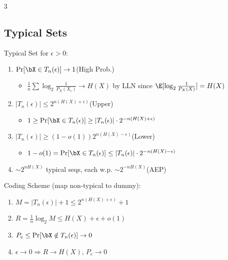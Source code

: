 \documentclass[12pt, a4paper]{article}
\begin{document}
\begin{multicols*}{3}
\subsection{Typical Sets}
Typical Set for $\epsilon>0$:
\begin{enumerate}[\roman*.]
  \item $\Pr[\bX\in T_n(\epsilon)]\to 1$\hfill(High Prob.)
    \begin{itemize}[leftmargin=*]\vspace{3pt}
      \item $\tfrac{1}{n}\sum\log_2\tfrac{1}{P_X(X_i)}\to H(X)$ by LLN since $\E[\log_2\tfrac{1}{P_X(X)}]=H(X)$
    \end{itemize}
  \item $|T_n(\epsilon)|\le 2^{n(H(X)+\epsilon)}$\hfill(Upper)
    \begin{itemize}[leftmargin=*]\vspace{3pt}
      \item $1\ge\Pr[\bX\in T_n(\epsilon)]\ge|T_n(\epsilon)|\cdot 2^{-n(H(X)+\epsilon)}$
    \end{itemize}
  \item $|T_n(\epsilon)|\ge(1-o(1))2^{n(H(X)-\epsilon)}$\hfill(Lower)
    \begin{itemize}[leftmargin=*]\vspace{3pt}
      \item $1-o(1)=\Pr[\bX\in T_n(\epsilon)]\le|T_n(\epsilon)|\cdot 2^{-n(H(X)-\epsilon)}$
    \end{itemize}
  \item $\sim 2^{nH(X)}$ typical seqs, each w.p. $\sim 2^{-nH(X)}$\hfill(AEP)
\end{enumerate}
 
Coding Scheme (map non-typical to dummy):
\begin{enumerate}[\roman*.]
  \item $M=|T_n(\epsilon)|+1\le 2^{n(H(X)+\epsilon)}+1$
  \item $R=\tfrac{1}{n}\log_2 M\le H(X)+\epsilon+o(1)$
  \item $P_e\le\Pr[\bX\notin T_n(\epsilon)]\to 0$
  \item $\epsilon\to 0\Rightarrow R\to H(X),\,P_e\to 0$
\end{enumerate}

\colbreak

\end{multicols*}
\end{document}
